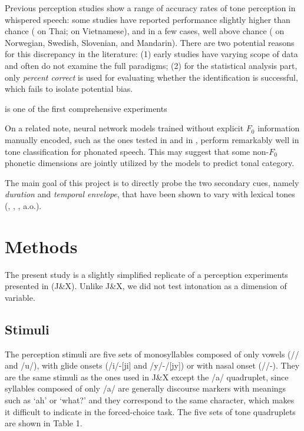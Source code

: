 \documentclass[12pt,letterpaper]{scrartcl}
\begin{document}
Previous perception studies show a range of accuracy rates of tone perception in whispered speech: some studies have reported performance slightly higher than chance (\cite{abramson1972TonalExperimentsWhispered} on Thai; \cite{miller1961WordToneRecognition} on Vietnamese), and in a few cases, well above chance (\cite{jensen1958RecognitionWordTones} on Norwegian, Swedish, Slovenian, and Mandarin). There are two potential reasons for this discrepancy in the literature: (1) early studies have varying scope of data and often do not examine the full paradigms; (2) for the statistical analysis part, only \textit{percent correct} is used for evaluating whether the identification is successful, which fails to isolate potential bias.

\cite{liu.samuel2004PerceptionMandarinLexical} is one of the first comprehensive experiments

On a related note, neural network models trained without explicit $F_0$ information manually encoded, such as the ones tested in \cite{ryant.etal2014Highlyaccuratemandarin} and in \cite{chen.etal2016ToneClassificationMandarina}, perform remarkably well in tone classification for phonated speech. This may suggest that some non-$F_0$ phonetic dimensions are jointly utilized by the models to predict tonal category.

The main goal of this project is to directly probe the two secondary cues, namely \textit{duration} and \textit{temporal envelope}, that have been shown to vary with lexical tones (\cite{tseng1981AcousticPhoneticStudy}, \cite{fu.zeng2000Identificationtemporalenvelope}, \cite{kong.zeng2006Temporalspectralcues}, a.o.).

\section{Methods}

The present study is a slightly simplified replicate of a perception experiments presented in \cite{jiao.xu2019WhisperedMandarinhas} (J\&X). Unlike J\&X, we did not test intonation as a dimension of variable. 

\subsection{Stimuli}

The perception stimuli are five sets of monosyllables composed of only vowels (// and /u/), with glide onsets (/i/-[ji] and /y/-/[jy]) or with nasal onset (//-). They are the same stimuli as the ones used in J\&X except the /a/ quadruplet, since syllables composed of only /a/ are generally discourse markers with meanings such as `ah' or `what?' and they correspond to the same character, which makes it difficult to indicate in the forced-choice task. The five sets of tone quadruplets are shown in Table 1.
\end{document}
